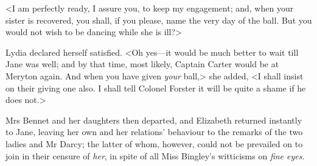 <I am perfectly ready, I assure you, to keep my engagement; and, when your sister is recovered, you shall, if you please, name the very day of the ball. But you would not wish to be dancing while she is ill?>

Lydia declared herself satisfied. <Oh yes—it would be much better to wait till Jane was well; and by that time, most likely, Captain Carter would be at Meryton again. And when you have given \textit{your} ball,> she added, <I shall insist on their giving one also. I shall tell Colonel Forster it will be quite a shame if he does not.>

Mrs Bennet and her daughters then departed, and Elizabeth returned instantly to Jane, leaving her own and her relations' behaviour to the remarks of the two ladies and Mr Darcy; the latter of whom, however, could not be prevailed on to join in their censure of \textit{her}, in spite of all Miss Bingley's witticisms on \textit{fine eyes}.